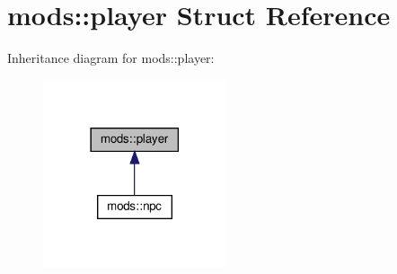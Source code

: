 \hypertarget{classmods_1_1player}{}\section{mods\+:\+:player Struct Reference}
\label{classmods_1_1player}


Inheritance diagram for mods\+:\+:player\+:
\nopagebreak
\begin{figure}[H]
\begin{center}
\leavevmode
\includegraphics[width=153pt]{classmods_1_1player__inherit__graph}
\end{center}
\end{figure}
